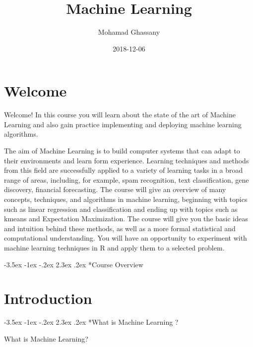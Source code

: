\documentclass[]{book}
\title{Machine Learning}
\author{Mohamad Ghassany}
\date{2018-12-06}
\makeatletter
\renewcommand\section{\@startsection {section}{1}{\z@}%
                                   {-3.5ex \@plus -1ex \@minus -.2ex}%
                                   {2.3ex \@plus.2ex}%
                                   {\normalfont\Large\bfseries\color{ForestGreen}}}
\theoremstyle{definition}
\theoremstyle{definition}
\theoremstyle{definition}
\theoremstyle{remark}
\makeatother
\begin{document}
\maketitle

{
\setcounter{tocdepth}{2}
\tableofcontents
}
\chapter*{Welcome}\label{welcome}

Welcome! In this course you will learn about the state of the art of
Machine Learning and also gain practice implementing and deploying
machine learning algorithms.

The aim of Machine Learning is to build computer systems that can adapt
to their environments and learn form experience. Learning techniques and
methods from this field are successfully applied to a variety of
learning tasks in a broad range of areas, including, for example, spam
recognition, text classification, gene discovery, financial forecasting.
The course will give an overview of many concepts, techniques, and
algorithms in machine learning, beginning with topics such as linear
regression and classification and ending up with topics such as kmeans
and Expectation Maximization. The course will give you the basic ideas
and intuition behind these methods, as well as a more formal statistical
and computational understanding. You will have an opportunity to
experiment with machine learning techniques in R and apply them to a
selected problem.

\section*{Course Overview}\label{course-overview}

\chapter*{Introduction}\label{introduction}

\section*{What is Machine Learning ?}\label{what-is-machine-learning}

What is Machine Learning?
\end{document}
